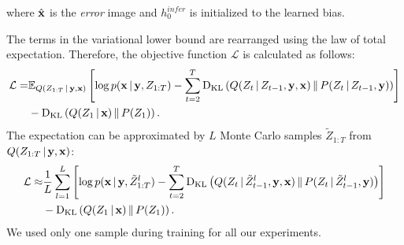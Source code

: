 \documentclass{article} %
\newcommand{\comm}[1]{}
\newcommand{\given}{\,|\,}
\newcommand{\expectation}{\mathbb{E}}
\newcommand{\kldiv}{\mathrm{D}_{\rm KL}}
\newcommand{\klBars}{\,\|\,}
\newcommand{\hdec}{h^{gen}}
\newcommand{\henc}{h^{infer}}
\newcommand{\Lat}{Z}
\newcommand{\numSamples}{L}
\newcommand{\sampleIdx}{l}
\newcommand{\LatSample}{\tilde{Z}}
\newcommand{\icaption}{{\bf{y}}}
\newcommand{\oimage}{{\bf{x}}}
\newcommand{\post}{Q}
\newcommand{\prior}{P}
\newcommand{\loss}{\mathcal{L}}
\newcommand{\lloss}{\mathcal{L}^{z}}
\newcommand{\rloss}{\mathcal{L}^{x}}
\begin{document}


where $\hat{\oimage}$ is the \textit{error} image and $\henc_0$ is initialized to the learned bias. 

The terms in the variational lower bound are rearranged using the law of total expectation. Therefore, the objective function $\loss$ is calculated as follows:
\begin{align}
\label{eq:loss}
\loss =  &\expectation_{Q(\Lat_{1:T}\given\icaption,\oimage)}\left[ \log p(\oimage\given\icaption,\Lat_{1:T}) - \sum_{t=2}^T\kldiv\left(\post(\Lat_t\given\Lat_{t-1},\icaption,\oimage)\klBars\prior(\Lat_t\given\Lat_{t-1},\icaption)\right) \right] \nonumber \\& - \kldiv\left(\post(\Lat_1\given\oimage)\klBars\prior(\Lat_1)\right).
\end{align}
The expectation can be approximated by $\numSamples$ Monte Carlo samples $\LatSample_{1:T}$ from $\post(\Lat_{1:T}\given\icaption, \oimage)$:
\begin{align}
\label{eq:loss_mc}
\loss \approx  &\frac{1}{\numSamples}\sum_{\sampleIdx=1}^\numSamples\left[ \log p(\oimage\given\icaption,\LatSample^\sampleIdx_{1:T}) - \sum_{t=2}^T\kldiv\left(\post(\Lat_t\given\LatSample^\sampleIdx_{t-1},\icaption,\oimage)\klBars\prior(\Lat_t\given\LatSample^\sampleIdx_{t-1},\icaption)\right) \right] \nonumber \\& - \kldiv\left(\post(\Lat_1\given\oimage)\klBars\prior(\Lat_1)\right).
\end{align}
We used only one sample during training for all our experiments.
\comm{
\begin{align}
\loss &= -\sum_{t=1}^{T}D_{KL}(\post(\Lat_t|\henc_t,s_{t-1})\,||\,\prior(\Lat_t)) + \frac{1}{L}\sum_{l=1}^{L}log\,p(x_{t}|y,z)\\
&=
\frac{1}{2}\sum_{t=1}^{T}(1 - 2\,log\,\sigma_{t}^{prior} + 2\,log\,\sigma_{t} - \frac{\exp(2\,log\,\sigma_{t}) + (\mu_{t} - \mu_{t}^{prior})^{2}}{\exp(2\,log\,\sigma_{t}^{prior})}) + \frac{1}{L}\sum_{l=1}^{L}log\,p(x_{t}|y,z)
\end{align}
}
\end{document}
